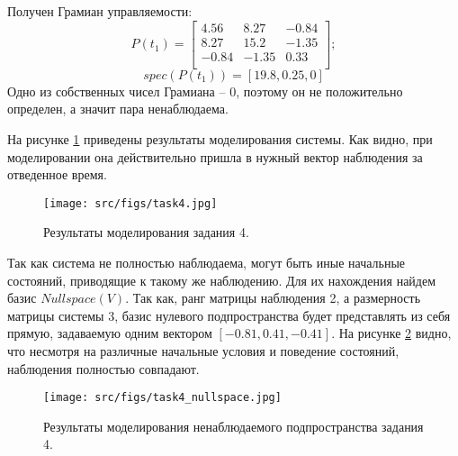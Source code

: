 Получен Грамиан управляемости:
\[
        P(t_1) = \begin{bmatrix}
        4.56 & 8.27 & -0.84 \\
        8.27 & 15.2 & -1.35 \\
        -0.84 & -1.35 & 0.33 \\
        \end{bmatrix};
\]
\[
        spec(P(t_1)) = [19.8,  0.25, 0]
\]
Одно из собственных чисел Грамиана -- 0, поэтому он не положительно определен, а значит пара ненаблюдаема.

На рисунке \ref{fig:task4} приведены результаты моделирования системы. Как видно, при моделировании она действительно пришла в нужный вектор наблюдения за отведенное время.
\begin{figure}[ht!]
        \centering
        \texttt{[image: src/figs/task4.jpg]}
        \caption{Результаты моделирования задания 4.}
        \label{fig:task4}
\end{figure}

Так как система не полностью наблюдаема, могут быть иные начальные состояний, приводящие к такому же наблюдению. Для их нахождения найдем базис \(Nullspace(V)\). Так как, ранг матрицы наблюдения 2, а размерность матрицы системы 3, базис нулевого подпространства будет представлять из себя прямую, задаваемую одним вектором \([-0.81, 0.41, -0.41]\).
На рисунке \ref{fig:task4_null} видно, что несмотря на различные начальные условия и поведение состояний, наблюдения полностью совпадают.
\begin{figure}[ht!]
        \centering
        \texttt{[image: src/figs/task4\_nullspace.jpg]}
        \caption{Результаты моделирования ненаблюдаемого подпространства задания 4.}
        \label{fig:task4_null}
\end{figure}

